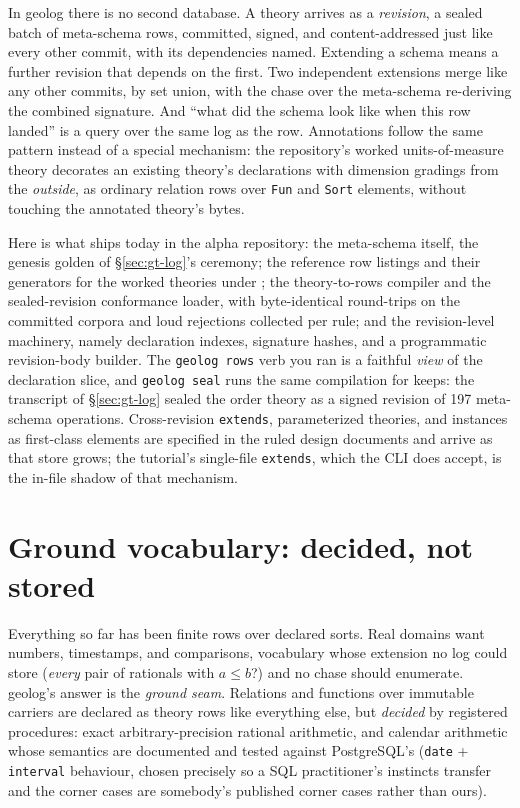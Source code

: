 In geolog there is no second database. A theory arrives as a
\emph{revision}, a sealed batch of meta-schema rows, committed,
signed, and content-addressed just like every other commit, with its
dependencies named. Extending a schema means a further revision that
depends on the first. Two independent extensions merge like any other
commits, by set union, with the chase over the meta-schema re-deriving
the combined signature. And ``what did the schema look like when this
row landed'' is a query over the same log as the row. Annotations
follow the same pattern instead of a special mechanism: the
repository's worked units-of-measure theory decorates an existing
theory's declarations with dimension gradings from the \emph{outside},
as ordinary relation rows over \texttt{Fun} and \texttt{Sort}
elements, without touching the annotated theory's bytes.

Here is what ships today in the alpha repository: the meta-schema
itself, the genesis golden of \S\ref{sec:gt-log}'s ceremony; the
reference row listings and their generators for the worked theories
under ; the theory-to-rows compiler and the
sealed-revision conformance loader, with byte-identical round-trips on
the committed corpora and loud rejections collected per rule; and the
revision-level machinery, namely declaration indexes, signature
hashes, and a programmatic revision-body builder. The \texttt{geolog
rows} verb you ran is a faithful \emph{view} of the declaration slice,
and \texttt{geolog seal} runs the same compilation for keeps: the
transcript of \S\ref{sec:gt-log} sealed the order theory as a signed
revision of 197 meta-schema operations. Cross-revision
\texttt{extends}, parameterized theories, and instances as
first-class elements are specified in the ruled design documents and
arrive as that store grows; the tutorial's single-file
\texttt{extends}, which the CLI does accept, is the in-file shadow of
that mechanism.

\section{Ground vocabulary: decided, not stored}
\label{sec:gt-ground}

Everything so far has been finite rows over declared sorts. Real
domains want numbers, timestamps, and comparisons, vocabulary whose
extension no log could store (\emph{every} pair of rationals with $a
\le b$?) and no chase should enumerate. geolog's answer is the
\emph{ground seam}. Relations and functions over immutable carriers
are declared as theory rows like everything else, but \emph{decided}
by registered procedures: exact arbitrary-precision rational
arithmetic, and calendar arithmetic whose semantics are documented and
tested against PostgreSQL's (\texttt{date} + \texttt{interval}
behaviour, chosen precisely so a SQL practitioner's instincts transfer
and the corner cases are somebody's published corner cases rather than
ours).

